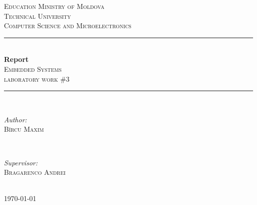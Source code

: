 \begin{titlepage}
\newcommand{\HRule}{\rule{\linewidth}{0.5mm}} 
\center
 

\textsc{\LARGE Education Ministry of Moldova}\\[1.5cm] 
\textsc{\Large Technical University}\\[0.5cm] 
\textsc{\large Computer Science and Microelectronics}\\[0.5cm]


\HRule \\[0.4cm]
{ \Huge \bfseries Report}\\[0.4cm]
\textsc{\large Embedded Systems}\\[0.5cm]
\textsc{ 
laboratory work \#3}\\[0.5cm]
\HRule \\[1.5cm]
 

\begin{minipage}{0.4\textwidth}
\begin{flushleft} \large
\emph{Author:}\\
\textsc{Bîrcu Maxim} %
\end{flushleft}
\end{minipage}
~
\begin{minipage}{0.4\textwidth}
\begin{flushright} \large
\emph{Supervisor:} \\
\textsc{Bragarenco Andrei} %
\end{flushright}
\end{minipage}\\[2cm]


\vfill
{\large \today}\\[2cm] %
\clearpage
 
\end{titlepage}